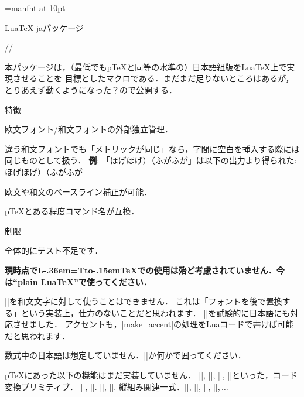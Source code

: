 
\overfullrule=0pt
\def\LaTeX{L\kern-.36em\setbox0=\hbox{T}\vbox to\ht0{\hbox{\sx A}\vss}\kern-.15em\TeX}
\font\mff=manfnt at 10pt
\def\mf{{\mff META{\rm\-}FONT}}
\def\textfontii{\the\textfont2 }
\def\AmS{{\textfontii A\kern-.1667em\lower.5ex\hbox{M}\kern-.125emS}}
\def\UPSILON{\char'7}%
\def\XyM{X\kern-.30em\smash{\raise.50ex\hbox{\UPSILON}}\kern-.30em{M}}%
\def\XyMTeX{\XyM\kern-.1em\TeX}%


\centerline{\big Lua\TeX-jaパッケージ}\bigskip
\centerline{\large\the\year/\the\month/\the\day}\medskip

\bigskip

本パッケージは，（最低でもp\TeX と同等の水準の）日本語組版をLua\TeX 上で実現させることを
目標としたマクロである．まだまだ足りないところはあるが，とりあえず動くようになった？ので公開する． 


\beginparagraph 特徴

\item 欧文フォント/和文フォントの外部独立管理．
\item 違う和文フォントでも「メトリックが同じ」なら，字間に空白を挿入する際には同じものとして扱う．
{\bf 例}: 「ほげほげ）{\gt （ふがふが}」は以下の出力より得られた:
\begintt
ほげほげ）{\gt （ふがふが}
\endtt
\item 欧文や和文のベースライン補正が可能．
\item p\TeX とある程度コマンド名が互換．
\enditem

\beginparagraph 制限

\item 全体的にテスト不足です．
\item {\bf 現時点で\LaTeX での使用は殆ど考慮されていません．今は``plain Lua\TeX''で使ってください．}
\item |\accent|を和文文字に対して使うことはできません．
これは「フォントを後で置換する」という実装上，仕方のないことだと思われます．
{\small|\/|を試験的に日本語にも対応させました．
アクセントも，|make_accent|の処理をLuaコードで書けば可能だと思われます．}
\item 数式中の日本語は想定していません．|\hbox|か何かで囲ってください．
\item p\TeX にあった以下の機能はまだ実装していません．
\itemitem |\euc|, |\jis|, |\sjis|, |\kuten|といった，コード変換プリミティブ．
\itemitem |\kansuji|, |\kansujichar|.
\itemitem |\showmode|, |\jfam|.
\itemitem 縦組み関連一式．|\tate|, |\tfont|, |\tbaselineshift|, |\dtou|,$\,\ldots$

